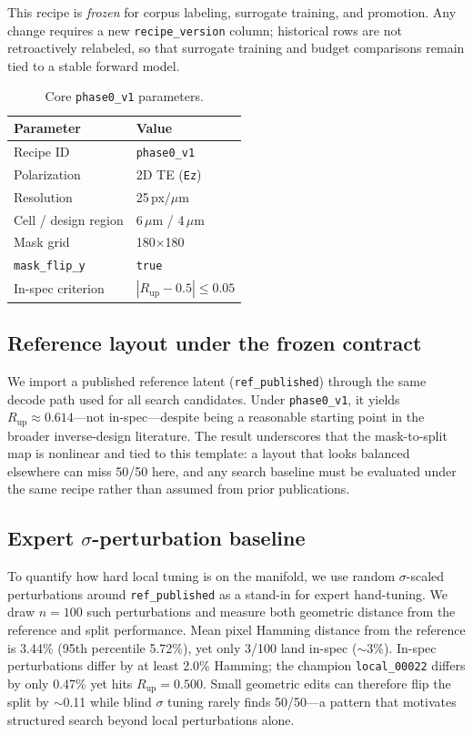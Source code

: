 \documentclass[11pt,a4paper]{article}
\begin{document}
This recipe is \emph{frozen} for corpus labeling, surrogate training, and promotion.
Any change requires a new \texttt{recipe\_version} column; historical rows are not retroactively relabeled, so that surrogate training and budget comparisons remain tied to a stable forward model.

\begin{table}[t]
  \centering
  \caption{Core \texttt{phase0\_v1} parameters.}
  \label{tab:recipe}
  \begin{tabular}{ll}
    \toprule
    Parameter & Value \\
    \midrule
    Recipe ID & \texttt{phase0\_v1} \\
    Polarization & 2D TE (\texttt{Ez}) \\
    Resolution & 25\,px/$\mu$m \\
    Cell / design region & 6\,$\mu$m / 4\,$\mu$m \\
    Mask grid & 180$\times$180 \\
    \texttt{mask\_flip\_y} & \texttt{true} \\
    In-spec criterion & $|R_{\mathrm{up}} - 0.5| \le 0.05$ \\
    \bottomrule
  \end{tabular}
\end{table}

\subsection{Reference layout under the frozen contract}

We import a published reference latent (\texttt{ref\_published}) through the same decode path used for all search candidates.
Under \texttt{phase0\_v1}, it yields $R_{\mathrm{up}} \approx 0.614$---not in-spec---despite being a reasonable starting point in the broader inverse-design literature.
The result underscores that the mask-to-split map is nonlinear and tied to this template: a layout that looks balanced elsewhere can miss 50/50 here, and any search baseline must be evaluated under the same recipe rather than assumed from prior publications.

\subsection{Expert $\sigma$-perturbation baseline}

To quantify how hard local tuning is on the manifold, we use random $\sigma$-scaled perturbations around \texttt{ref\_published} as a stand-in for expert hand-tuning.
We draw $n{=}100$ such perturbations and measure both geometric distance from the reference and split performance.
Mean pixel Hamming distance from the reference is 3.44\% (95th percentile 5.72\%), yet only 3/100 land in-spec ($\sim$3\%).
In-spec perturbations differ by at least 2.0\% Hamming; the champion \texttt{local\_00022} differs by only 0.47\% yet hits $R_{\mathrm{up}} = 0.500$.
Small geometric edits can therefore flip the split by $\sim$0.11 while blind $\sigma$ tuning rarely finds 50/50---a pattern that motivates structured search beyond local perturbations alone.
\end{document}
